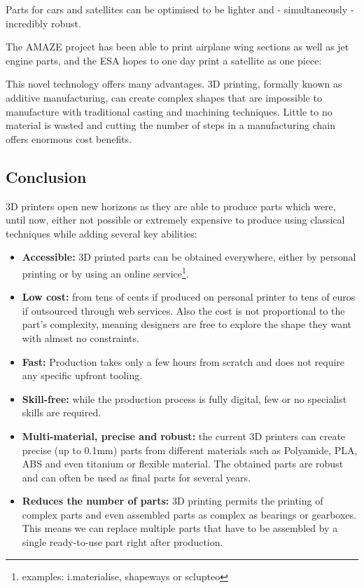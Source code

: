 Parts for cars and satellites can be optimised to be lighter and - simultaneously - incredibly robust.

The AMAZE project has been able to print airplane wing sections as well as jet engine parts, and the ESA hopes to one day print a satellite as one piece:
\begin{formal}
    This novel technology offers many advantages. 3D printing, formally known as additive manufacturing, can create complex shapes that are impossible to manufacture with traditional casting and machining techniques. Little to no material is wasted and cutting the number of steps in a manufacturing chain offers enormous cost benefits.
\end{formal}




\subsection{Conclusion} %

3D printers open new horizons as they are able to produce parts which were, until now, either not possible or extremely expensive to produce using classical techniques while adding several key abilities:
\begin{itemize}
    \item \textbf{Accessible:} 3D printed parts can be obtained everywhere, either by personal printing or by using an online service\footnote{examples: i.materialise, shapeways or sclupteo}.
    \item \textbf{Low cost:}  from tens of cents if produced on personal printer to tens of euros if outsourced through web services. Also the cost is not proportional to the part’s complexity, meaning designers are free to explore the shape they want with almost no constraints.
    \item \textbf{Fast:} Production takes only a few hours from scratch and does not require any specific upfront tooling.
    \item \textbf{Skill-free:} while the production process is fully digital, few or no specialist skills are required.
    \item \textbf{Multi-material, precise and robust:} the current 3D printers can create precise (up to 0.1mm) parts from different materials such as Polyamide, PLA, ABS and even titanium or flexible material. The obtained parts are robust and can often be used as final parts for several years.
    \item \textbf{Reduces the number of parts:} 3D printing permits the printing of complex parts and even assembled parts as complex as bearings or gearboxes. This means we can replace multiple parts that have to be assembled by a single ready-to-use part right after production.
\end{itemize}



